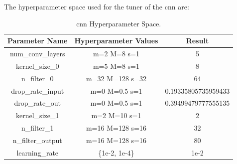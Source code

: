 \documentclass{article}
\begin{document}
\centerline{The hyperparameter space used for the tuner of the \acrshort{cnn} are:}

\begin{table}[!ht]
\begin{center}
\begin{tabular}{||c | c | c ||} 
 \hline
 Parameter Name & Hyperparameter Values & Result\\ [0.5ex] 
 \hline\hline
 num\_conv\_layers & \acrshort{m}=2 \acrshort{M}=8 \acrshort{s}=1 &  5\\ 
    \hline
    kernel\_size\_0 & \acrshort{m}=5 \acrshort{M}=8 \acrshort{s}=1 &  8\\ 
    \hline
    n\_filter\_0 & \acrshort{m}=32 \acrshort{M}=128 \acrshort{s}=32 & 64\\
    \hline
    drop\_rate\_input & \acrshort{m}=0 \acrshort{M}=0.5 \acrshort{s}=1 & 0.19335805735959433\\
    \hline
    drop\_rate\_out & \acrshort{m}=0 \acrshort{M}=0.5 \acrshort{s}=1 & 0.39499479777555135\\
    \hline
    kernel\_size\_1 & \acrshort{m}=2 \acrshort{M}=10 \acrshort{s}=1 & 2\\ 
    \hline
    n\_filter\_1 & \acrshort{m}=16 \acrshort{M}=128 \acrshort{s}=16 & 32\\
    \hline
    n\_filter\_output & \acrshort{m}=16 \acrshort{M}=128 \acrshort{s}=16 & 80\\
    \hline
    learning\_rate & \{1e-2, 1e-4\} & 1e-2\\
    \hline
\end{tabular}
\caption{\label{tab:CNN_Hyperparameter} \acrshort{cnn} Hyperparameter Space.}
\end{center}
\end{table}
\end{document}
